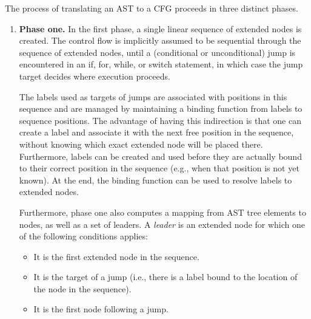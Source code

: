 The process of translating an AST to a CFG proceeds in three distinct phases.
\begin{enumerate}
    \item \textbf{Phase one.} In the first phase, a single linear
      sequence of extended nodes is created. The control flow is
      implicitly assumed to be sequential through the sequence of
      extended nodes, until a (conditional or unconditional) jump is
      encountered in an if, for, while, or switch statement, in which
      case the jump target decides where execution proceeds.

    The labels used as targets of jumps are associated with positions
    in this sequence and are managed by maintaining a binding function
    from labels to sequence positions. The advantage of having this
    indirection is that one can create a label and associate it with the
    next free position in the sequence, without knowing which exact
    extended node will be placed there.  Furthermore, labels can be
    created and used before they are actually bound to their correct
    position in the sequence (e.g., when that position is not yet
    known).  At the end, the binding function can be used to resolve
    labels to extended nodes.

    Furthermore, phase one also computes a mapping from AST tree
    elements to nodes, as well as a set of leaders. A \emph{leader} is
    an extended node for which one of the following conditions
    applies:
    \begin{itemize}
    \item It is the first extended node in the sequence.
    \item It is the target of a jump (i.e., there is a label bound to
      the location of the node in the sequence).
    \item It is the first node following a jump.
    \end{itemize}


\end{enumerate}
